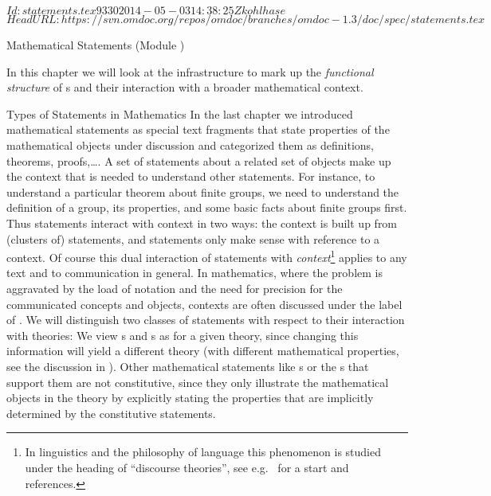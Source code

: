 \svnInfo $Id: statements.tex 9330 2014-05-03 14:38:25Z kohlhase $
\svnKeyword $HeadURL: https://svn.omdoc.org/repos/omdoc/branches/omdoc-1.3/doc/spec/statements.tex $

\begin{tchapter}[id=statements,short=Mathematical Statements]{Mathematical Statements (Module {})}

  In this chapter we will look at the {\omdoc} infrastructure to mark up the
  {\emph{functional structure}} of {s} and their
  interaction with a broader mathematical context.
  
\begin{tsection}[id=statements-constitutive]{Types of Statements in Mathematics}
  In the last chapter we introduced mathematical statements as special text fragments that
  state properties of the mathematical objects under discussion and categorized them as
  definitions, theorems, proofs,\ldots. A set of statements about a related set of objects
  make up the context that is needed to understand other statements.  For instance, to
  understand a particular theorem about finite groups, we need to understand the
  definition of a group, its properties, and some basic facts about finite groups
  first. Thus statements interact with context in two ways: the context is built up from
  (clusters of) statements, and statements only make sense with reference to a context. Of
  course this dual interaction of statements with {\emph{context}}\footnote{In linguistics
    and the philosophy of language this phenomenon is studied under the heading of
    ``discourse theories{}'', see e.g.~\cite{KamRey:fdtl93} for a
    start and references.}  applies to any text and to communication in general. In
  mathematics, where the problem is aggravated by the load of notation and the need for
  precision for the communicated concepts and objects, contexts are often discussed under
  the label of {}. We will
  distinguish two classes of statements with respect to their interaction with theories:
  We view {s} and {s} as {} for a
  given theory, since changing this information will yield a different theory (with
  different mathematical properties, see the discussion in {}).  Other
  mathematical statements like {s} or the {s} that
  support them are not constitutive, since they only illustrate the mathematical objects
  in the theory by explicitly stating the properties that are implicitly determined by the
  constitutive statements.
  

\end{tsection}
\end{tchapter}
